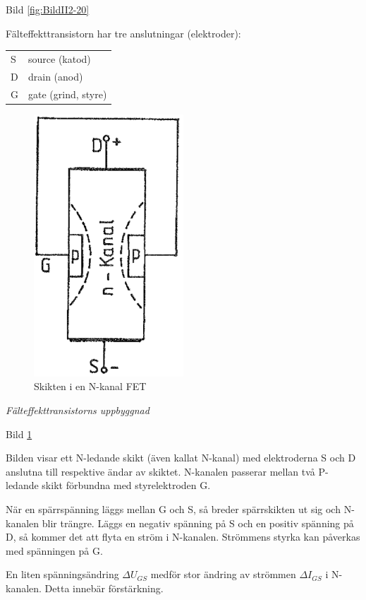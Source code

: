 Bild \ref{fig:BildII2-20}

Fälteffekttransistorn har tre anslutningar (elektroder):

\begin{tabular}{ll}
  S & source (katod) \\
  D & drain (anod) \\
  G & gate (grind, styre) \\
\end{tabular}

\begin{figure}
\includegraphics[width=0.5\textwidth]{images/cropped_pdfs/bild_2_2-21.pdf}
\caption{Skikten i en N-kanal FET}
\label{fig:BildII2-21}
\end{figure}

\emph{Fälteffekttransistorns uppbyggnad}

Bild \ref{fig:BildII2-21}

Bilden visar ett N-ledande skikt (även kallat N-kanal) med elektroderna S och D
anslutna till respektive ändar av skiktet. N-kanalen passerar mellan två
P-ledande skikt förbundna med styrelektroden G.

När en spärrspänning läggs mellan G och S, så breder spärrskikten ut sig och
N-kanalen blir trängre. Läggs en negativ spänning på S och en positiv spänning
på D, så kommer det att flyta en ström i N-kanalen. Strömmens styrka kan
påverkas med spänningen på G.

En liten spänningsändring \(\Delta U_{GS}\) medför stor ändring av strömmen
\(\Delta I_{GS}\) i N-kanalen. Detta innebär förstärkning.

